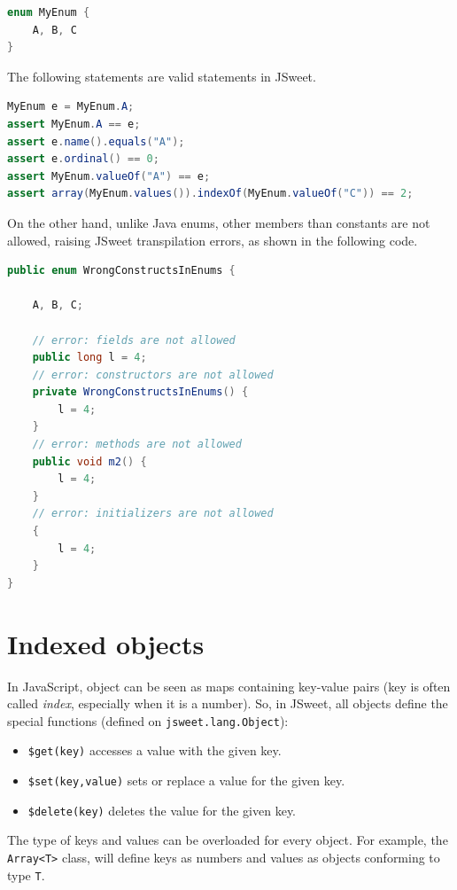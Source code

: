 \documentclass[a4paper]{report}
\begin{document}
\begin{lstlisting}[language=Java]
enum MyEnum {
	A, B, C
}
\end{lstlisting}

The following statements are valid statements in JSweet.

\begin{lstlisting}[language=Java]
MyEnum e = MyEnum.A;
assert MyEnum.A == e;
assert e.name().equals("A");
assert e.ordinal() == 0;
assert MyEnum.valueOf("A") == e;
assert array(MyEnum.values()).indexOf(MyEnum.valueOf("C")) == 2;
\end{lstlisting}

On the other hand, unlike Java enums, other members than constants are not allowed, raising JSweet transpilation errors, as shown in the following code.

\begin{lstlisting}[language=Java]
public enum WrongConstructsInEnums {

	A, B, C;
	
	// error: fields are not allowed
	public long l = 4;
	// error: constructors are not allowed	
	private WrongConstructsInEnums() {
		l = 4;
	}
	// error: methods are not allowed
	public void m2() {
		l = 4;
	}
	// error: initializers are not allowed
	{
		l = 4;
	}
}
\end{lstlisting}

\section{Indexed objects}

In JavaScript, object can be seen as maps containing key-value pairs (key is often called \emph{index}, especially when it is a number). So, in JSweet, all objects define the special functions (defined on \texttt{jsweet.lang.Object}):

\begin{itemize}
\item \texttt{\$get(key)} accesses a value with the given key.
\item \texttt{\$set(key,value)} sets or replace a value for the given key.
\item \texttt{\$delete(key)} deletes the value for the given key.
\end{itemize}

The type of keys and values can be overloaded for every object. For example, the \texttt{Array<T>} class, will define keys as numbers and values as objects conforming to type \texttt{T}.
\end{document}
